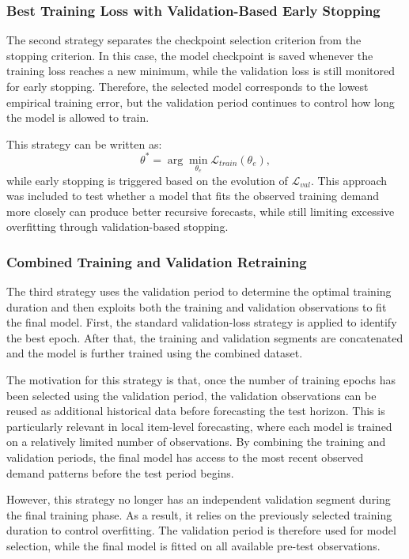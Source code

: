 \subsubsection{Best Training Loss with Validation-Based Early Stopping}

The second strategy separates the checkpoint selection criterion from the stopping criterion. In this case, the model checkpoint is saved whenever the training loss reaches a new minimum, while the validation loss is still monitored for early stopping. Therefore, the selected model corresponds to the lowest empirical training error, but the validation period continues to control how long the model is allowed to train.

This strategy can be written as:
\[
    \theta^{*} = \arg\min_{\theta_e} \mathcal{L}_{train}(\theta_e),
\]
while early stopping is triggered based on the evolution of \(\mathcal{L}_{val}\). This approach was included to test whether a model that fits the observed training demand more closely can produce better recursive forecasts, while still limiting excessive overfitting through validation-based stopping.

\subsubsection{Combined Training and Validation Retraining}

The third strategy uses the validation period to determine the optimal training duration and then exploits both the training and validation observations to fit the final model. First, the standard validation-loss strategy is applied to identify the best epoch. After that, the training and validation segments are concatenated and the model is further trained using the combined dataset.

The motivation for this strategy is that, once the number of training epochs has been selected using the validation period, the validation observations can be reused as additional historical data before forecasting the test horizon. This is particularly relevant in local item-level forecasting, where each model is trained on a relatively limited number of observations. By combining the training and validation periods, the final model has access to the most recent observed demand patterns before the test period begins.

However, this strategy no longer has an independent validation segment during the final training phase. As a result, it relies on the previously selected training duration to control overfitting. The validation period is therefore used for model selection, while the final model is fitted on all available pre-test observations.

